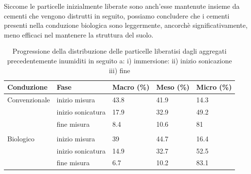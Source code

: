 \documentclass[11pt, a4paper, openright, titlepage, final, language = italian]{book}
\begin{document}
Siccome le particelle inizialmente liberate sono anch'esse mantenute
insieme da cementi che vengono distrutti in seguito, possiamo
concludere che i cementi presenti nella conduzione biologica sono
leggermente, ancorch\`e significativamente, meno efficaci nel
mantenere la struttura del suolo.




\begin{table}[ht]
\centering
\begin{tabular}{lllll}
  \hline
Conduzione & Fase & Macro (\%) & Meso (\%) & Micro (\%) \\ 
  \hline
Convenzionale & inizio misura & 43.8 & 41.9 & 14.3 \\ 
    & inizio sonicatura & 17.9 & 32.9 & 49.2 \\ 
    & fine misura & 8.4 & 10.6 & 81 \\ 
   &  &  &  &  \\ 
  Biologico  & inizio misura & 39 & 44.7 & 16.4 \\ 
    & inizio sonicatura & 14.9 & 32.7 & 52.5 \\ 
    & fine misura & 6.7 & 10.2 & 83.1 \\ 
   \hline
\end{tabular}
\caption{Progressione della distribuzione delle particelle 
                  liberatisi dagli aggregati precedentemente inumiditi in seguito a: 
                  i) immersione:
                  ii) inizio sonicazione 
                  iii) fine  } 
\label{tab:iufw}
\end{table}
\end{document}
